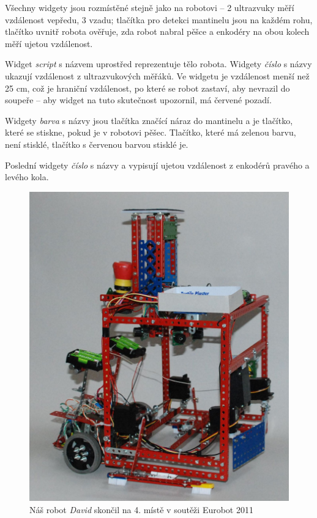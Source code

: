 \documentclass[12pt, a4paper, oneside]{article}
\newcommand{\It}{\textit}  %
\begin{document}
Všechny widgety jsou rozmístěné stejně jako na robotovi -- 2 ultrazvuky měří vzdálenost vepředu, 3 vzadu; tlačítka pro detekci mantinelu jsou na každém rohu, tlačítko uvnitř robota ověřuje,  zda robot nabral pěšce a enkodéry na obou kolech měří ujetou vzdálenost.

Widget \It{script} s názvem  uprostřed reprezentuje tělo robota. Widgety \It{číslo} s názvy  ukazují vzdálenost z ultrazvukových měřáků. Ve widgetu  je vzdálenost menší než 25 cm, což je hraniční vzdálenost, po které se robot zastaví, aby nevrazil do soupeře -- aby widget na tuto skutečnost upozornil, má červené pozadí.

Widgety \It{barva} s názvy  jsou tlačítka značící náraz do mantinelu a  je tlačítko, které se stiskne, pokud je v robotovi pěšec. Tlačítko, které má zelenou barvu, není stisklé, tlačítko s červenou barvou stisklé je.

Poslední widgety \It{číslo} s názvy  a  vypisují ujetou vzdálenost z enkodérů pravého a levého kola.

\begin{figure}[H]
\begin{center}
\includegraphics[width=\textwidth]{img/use_david_robot.jpg}
\caption{Náš robot \It{David} skončil na 4. místě v soutěži Eurobot 2011}
\end{center}
\end{figure}
\end{document}
